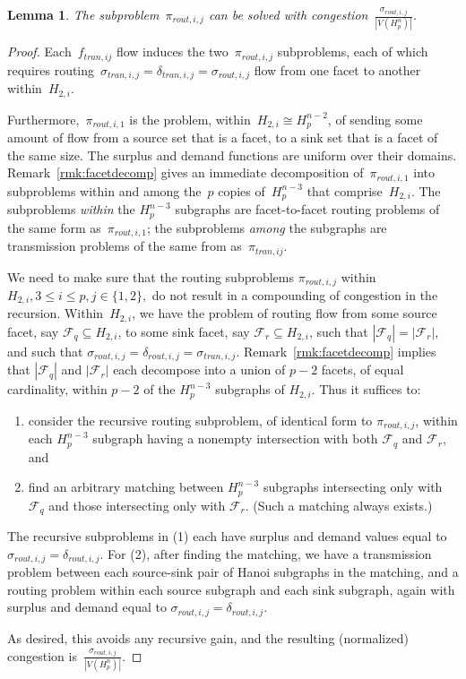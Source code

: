 \documentclass[
final
]{dmtcs-episciences}
\newtheorem{lemma}[theorem]{Lemma}
\begin{document}
\begin{lemma}\label{lem:fdistroutrec}
The subproblem~$\pi_{rout,i,j}$ can be solved with congestion~$\frac{\sigma_{rout,i,j}}{|V(H_p^n)|}$.
\end{lemma}
\begin{proof}
    Each~$f_{tran,ij}$ flow induces the two~$\pi_{rout,i,j}$ subproblems, each of which requires routing~$\sigma_{tran,i,j} = \delta_{tran,i,j} = \sigma_{rout,i,j}$ flow from one facet to another within~$H_{2,i}$.

Furthermore,~$\pi_{rout,i,1}$ is the problem, within~$H_{2,i} \cong H_p^{n-2}$, of sending some amount of flow from a source set that is a facet, to a sink set that is a facet of the same size. The surplus and demand functions are uniform over their domains. Remark~\ref{rmk:facetdecomp} gives an immediate decomposition of~$\pi_{rout,i,1}$ into subproblems within and among the~$p$ copies of~$H_p^{n-3}$ that comprise~$H_{2,i}$. The subproblems \emph{within} the $H_p^{n-3}$ subgraphs are facet-to-facet routing problems of the same form as~$\pi_{rout,i,1}$; the subproblems \emph{among} the subgraphs are transmission problems of the same from as~$\pi_{tran,ij}$.

    
    We need to make sure that the routing subproblems $\pi_{rout,i,j}$ within $H_{2,i}, 3 \leq i \leq p, j \in \{1,2\},$ do not result in a compounding of congestion in the recursion. Within~$H_{2,i}$, we have the problem of routing flow from some source facet, say $\mathcal{F}_q \subseteq H_{2,i}$, to some sink facet, say $\mathcal{F}_r \subseteq H_{2,i}$, such that $|\mathcal{F}_q| = |\mathcal{F}_r|$, and such that $\sigma_{rout,i,j} = \delta_{rout,i,j} = \sigma_{tran,i,j}$. Remark~\ref{rmk:facetdecomp} implies that $|\mathcal{F}_q|$ and $|\mathcal{F}_r|$ each decompose into a union of $p - 2$ facets, of equal cardinality, within $p - 2$ of the $H_p^{n-3}$ subgraphs of $H_{2,i}$. Thus it suffices to:
    \begin{enumerate}
    \item consider the recursive routing subproblem, of identical form to $\pi_{rout,i,j}$, within each $H_p^{n-3}$ subgraph having a nonempty intersection with both $\mathcal{F}_q$ and $\mathcal{F}_r$, and
    \item find an arbitrary matching between $H_p^{n-3}$ subgraphs intersecting only with $\mathcal{F}_q$ and those intersecting only with $\mathcal{F}_r$. (Such a matching always exists.)
    \end{enumerate}
    
    The recursive subproblems in (1) each have surplus and demand values equal to $\sigma_{rout,i,j} = \delta_{rout,i,j}$. For (2), after finding the matching, we have a transmission problem between each source-sink pair of Hanoi subgraphs in the matching, and a routing problem within each source subgraph and each sink subgraph, again with surplus and demand equal to $\sigma_{rout,i,j} = \delta_{rout,i,j}$. 

    As desired, this avoids any recursive gain, and the resulting (normalized) congestion is~$\frac{\sigma_{rout,i,j}}{|V(H_p^n)|}$.

\end{proof}
\end{document}

